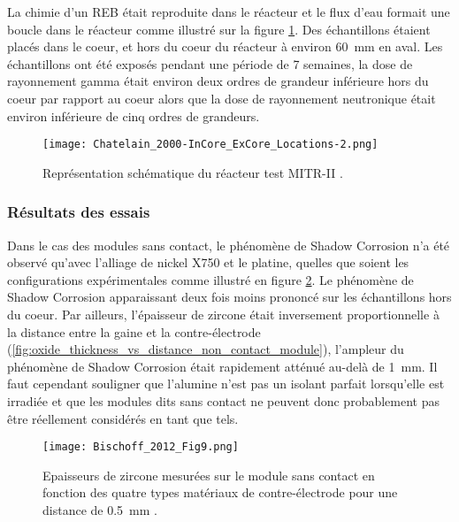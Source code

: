 \begin{refsection}
        La chimie d’un REB était reproduite dans le réacteur et le flux d’eau formait une boucle dans le
        réacteur comme illustré sur la figure \ref{fig:MITRII_reactor_schematics}. Des
        échantillons étaient placés dans le coeur, et hors du coeur du réacteur à environ
        \SI{60}{\milli\meter} en aval. Les échantillons ont été exposés pendant une période de 7 semaines, la dose
        de rayonnement gamma était environ deux ordres de grandeur inférieure hors du coeur
        par rapport au coeur alors que la dose de rayonnement neutronique était environ inférieure de cinq ordres de
        grandeurs.

	\begin{figure}[H] 
 		\centering 
 		\texttt{[image: Chatelain\_2000-InCore\_ExCore\_Locations-2.png]} 
        \caption[Représentation schématique du réacteur test MITR-II.]
        {Représentation schématique du réacteur test MITR-II \citep{Chatelain2000}.} 
 		\label{fig:MITRII_reactor_schematics} 
 	\end{figure}
	
	\subsubsection{Résultats des essais}
        Dans le cas des modules sans contact, le phénomène de Shadow Corrosion n'a été
        observé qu'avec l’alliage de nickel X750 et le platine, quelles que
        soient les configurations expérimentales comme illustré en figure
        \ref{fig:oxide_thickness_vs_counter_material_non_contact_module}. Le
        phénomène de Shadow Corrosion apparaissant deux fois moins prononcé sur les
        échantillons hors du coeur. Par ailleurs, l’épaisseur de zircone était inversement
        proportionnelle à la distance entre la gaine et la contre-électrode
        (\ref{fig:oxide_thickness_vs_distance_non_contact_module}), l'ampleur du phénomène
        de Shadow Corrosion était rapidement atténué au-delà de
        \SI{1}{\milli\meter}. Il faut cependant souligner que l’alumine n’est pas un
        isolant parfait lorsqu'elle est irradiée \citep{Shikama1994} et
        que les modules dits sans contact ne peuvent donc probablement pas être réellement considérés en tant que
        tels.

        \begin{figure}[H]
            \centering
            \texttt{[image: Bischoff\_2012\_Fig9.png]} 
            \caption[Epaisseurs de zircone mesurées sur le module sans contact en fonction des quatre types matériaux de
            contre-électrode pour une distance gaine--contre-électrode de \SI{0.5}{\milli\meter}.]
            {Epaisseurs de zircone mesurées sur le module sans contact en fonction des quatre types matériaux de
            contre-électrode pour une distance de \SI{0.5}{\milli\meter} \citep{Chatelain2000}.} 
            \label{fig:oxide_thickness_vs_counter_material_non_contact_module} 
        \end{figure}


\end{refsection}
